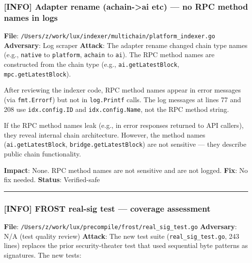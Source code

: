 \documentclass[
]{article}
\begin{document}
\subsubsection{{[}INFO{]} Adapter rename (achain-\textgreater ai etc)
--- no RPC method names in
logs}\label{info-adapter-rename-achain-ai-etc--no-rpc-method-names-in-logs}

\textbf{File}:
\texttt{/Users/z/work/lux/indexer/multichain/platform\_indexer.go}
\textbf{Adversary}: Log scraper \textbf{Attack}: The adapter rename
changed chain type names (e.g., \texttt{native} to \texttt{platform},
\texttt{achain} to \texttt{ai}). The RPC method names are constructed
from the chain type (e.g., \texttt{ai.getLatestBlock},
\texttt{mpc.getLatestBlock}).

After reviewing the indexer code, RPC method names appear in error
messages (via \texttt{fmt.Errorf}) but not in \texttt{log.Printf} calls.
The log messages at lines 77 and 208 use \texttt{idx.config.ID} and
\texttt{idx.config.Name}, not the RPC method string.

If the RPC method names leak (e.g., in error responses returned to API
callers), they reveal internal chain architecture. However, the method
names (\texttt{ai.getLatestBlock}, \texttt{bridge.getLatestBlock}) are
not sensitive --- they describe public chain functionality.

\textbf{Impact}: None. RPC method names are not sensitive and are not
logged. \textbf{Fix}: No fix needed. \textbf{Status}: Verified-safe

\begin{center}\rule{0.5\linewidth}{0.5pt}\end{center}

\subsubsection{{[}INFO{]} FROST real-sig test --- coverage
assessment}\label{info-frost-real-sig-test--coverage-assessment}

\textbf{File}:
\texttt{/Users/z/work/lux/precompile/frost/real\_sig\_test.go}
\textbf{Adversary}: N/A (test quality review) \textbf{Attack}: The new
test suite (\texttt{real\_sig\_test.go}, 243 lines) replaces the prior
security-theater test that used sequential byte patterns as signatures.
The new tests:
\end{document}
